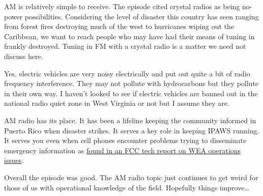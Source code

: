 AM is relatively simple to receive. The episode cited crystal radios as
being no-power possibilities. Considering the level of disaster this
country has seen ranging from forest fires destroying much of the west
to hurricanes wiping out the Caribbean, we want to reach people who may
have had their means of tuning in frankly destroyed. Tuning in FM with a
crystal radio is a matter we need not discuss here.

Yes, electric vehicles are very noisy electrically and put out quite a
bit of radio frequency interference. They may not pollute with
hydrocarbons but they pollute in their own way. I haven't looked to see
if electric vehicles are banned out in the national radio quiet zone in
West Virginia or not but I assume they are.

AM radio has its place. It has been a lifeline keeping the community
informed in Puerto Rico when disaster strikes. It serves a key role in
keeping IPAWS running. It serves you even when cell phones encounter
problems trying to disseminate emergency information as
\href{https://www.fcc.gov/document/wireless-emergency-alerts-2022-performance-exercise-report}{found
in an FCC tech report on WEA operations issues}.

Overall the episode was good. The AM radio topic just continues to get
weird for those of us with operational knowledge of the field. Hopefully
things improve\ldots{}
